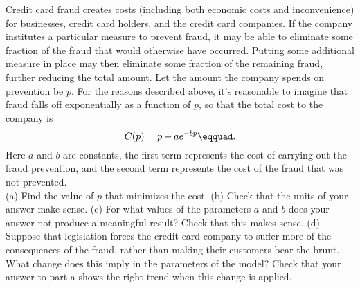 Credit card fraud creates costs (including both economic costs and
inconvenience) for businesses, credit card holders, and the credit
card companies. If the company institutes a particular measure to
prevent fraud, it may be able to eliminate some fraction of the fraud
that would otherwise have occurred. Putting some additional measure in place
may then eliminate some fraction of the remaining fraud, further reducing
the total amount. Let the amount the company spends on prevention be $p$.
For the reasons described above, it's reasonable to imagine that fraud
falls off exponentially as a function of $p$, so that the total cost
to the company is
\begin{equation*}
  C(p) = p+ae^{-bp}\eqquad.
\end{equation*}
Here $a$ and $b$ are constants, the first term represents the cost of
carrying out the fraud prevention, and the second term represents
the cost of the fraud that was not prevented.\\
(a) Find the value of $p$ that minimizes the cost.\answercheck\hwendpart
(b) Check that the units of your answer make sense.\hwendpart
(c) For what values of the parameters $a$ and
$b$ does your answer not produce a meaningful result? Check that this
makes sense.\hwendpart
(d) Suppose that legislation forces the credit card company to suffer
more of the consequences of the fraud, rather than making their customers
bear the brunt. What change does this imply in the parameters of the model?
Check that your answer to part a shows the right trend when this change
is applied.
